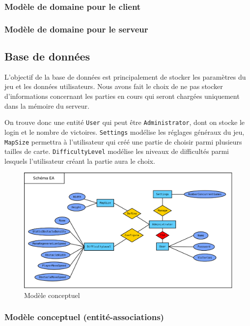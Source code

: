 \documentclass[a4paper,11pt]{article}
\begin{document}
	\subsubsection{Modèle de domaine pour le client}
	\subsubsection{Modèle de domaine pour le serveur}
	
	
	\subsection{Base de données}
	L'objectif de la base de données est principalement de stocker les paramètres du jeu et les données utilisateurs. Nous avons fait le choix de ne pas stocker d'informations concernant les parties en cours qui seront chargées uniquement dans la mémoire du serveur. \par
	
	On trouve donc une entité \texttt{User} qui peut être \texttt{Administrator}, dont on stocke le login et le nombre de victoires. \texttt{Settings} modélise les réglages généraux du jeu, \texttt{MapSize} permettra à l'utilisateur qui créé une partie de choisir parmi plusieurs tailles de carte. \texttt{DifficultyLevel} modélise les niveaux de difficultés parmi lesquels l'utilisateur créant la partie aura le choix.
	
	\begin{figure}[ht]
		\centering
		\includegraphics[width=\textwidth]{../Database/ER_diagram.png}
		\caption{Modèle conceptuel}
		\label{fig:database_er}
	\end{figure}

	\subsubsection{Modèle conceptuel (entité-associations)}
	
\end{document}
